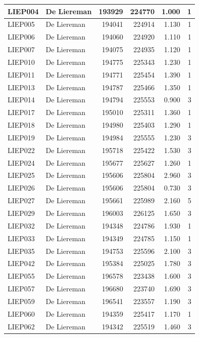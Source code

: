 \documentclass[11pt,]{book}
\begin{document}
\begin{table}
\begin{tabular}[t]{l|l|r|r|r|r}
\hline
LIEP004 & De Liereman & 193929 & 224770 & 1.000 & 1\\
\hline
LIEP005 & De Liereman & 194041 & 224914 & 1.130 & 1\\
\hline
LIEP006 & De Liereman & 194060 & 224920 & 1.110 & 1\\
\hline
LIEP007 & De Liereman & 194075 & 224935 & 1.120 & 1\\
\hline
LIEP010 & De Liereman & 194775 & 225343 & 1.230 & 1\\
\hline
LIEP011 & De Liereman & 194771 & 225454 & 1.390 & 1\\
\hline
LIEP013 & De Liereman & 194787 & 225466 & 1.350 & 1\\
\hline
LIEP014 & De Liereman & 194794 & 225553 & 0.900 & 3\\
\hline
LIEP017 & De Liereman & 195010 & 225311 & 1.360 & 1\\
\hline
LIEP018 & De Liereman & 194980 & 225403 & 1.290 & 1\\
\hline
LIEP019 & De Liereman & 194984 & 225555 & 1.230 & 3\\
\hline
LIEP022 & De Liereman & 195718 & 225422 & 1.530 & 3\\
\hline
LIEP024 & De Liereman & 195677 & 225627 & 1.260 & 1\\
\hline
LIEP025 & De Liereman & 195606 & 225804 & 2.960 & 3\\
\hline
LIEP026 & De Liereman & 195606 & 225804 & 0.730 & 3\\
\hline
LIEP027 & De Liereman & 195661 & 225989 & 2.160 & 5\\
\hline
LIEP029 & De Liereman & 196003 & 226125 & 1.650 & 3\\
\hline
LIEP032 & De Liereman & 194348 & 224786 & 1.930 & 1\\
\hline
LIEP033 & De Liereman & 194349 & 224785 & 1.150 & 1\\
\hline
LIEP035 & De Liereman & 194753 & 225596 & 2.100 & 3\\
\hline
LIEP042 & De Liereman & 195384 & 225025 & 1.780 & 3\\
\hline
LIEP055 & De Liereman & 196578 & 223438 & 1.600 & 3\\
\hline
LIEP057 & De Liereman & 196680 & 223740 & 1.690 & 3\\
\hline
LIEP059 & De Liereman & 196541 & 223557 & 1.190 & 3\\
\hline
LIEP060 & De Liereman & 194359 & 225417 & 1.170 & 1\\
\hline
LIEP062 & De Liereman & 194342 & 225519 & 1.460 & 3\\

\end{tabular}
\end{table}
\end{document}
